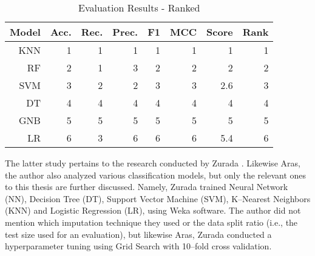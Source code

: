 \begin{table}[H]
    \small
    \setlength{\tabcolsep}{8pt}
    \renewcommand{\arraystretch}{1.3}
    \centering
    \caption[Evaluation Results - Ranked \citep{serkan2021bagging}]{Evaluation Results - Ranked \citep{serkan2021bagging}}\label{tab:serkanresultsranks}
    \begin{tabular}{r r r r r r r r}
    \toprule
    \textbf{Model} & \textbf{Acc.} & \textbf{Rec.} & \textbf{Prec.} & \textbf{F1} & \textbf{MCC} & \textbf{Score} & \textbf{Rank} \\
    \midrule
    \hline
	
    KNN & 1 & 1 & 1 & 1 & 1 & 1 & 1 \\ 
    RF & 2 & 1 & 3 & 2 & 2 & 2 & 2 \\ 
    SVM & 3 & 2 & 2 & 3 & 3 & 2.6 & 3 \\ 
    DT & 4 & 4 & 4 & 4 & 4 & 4 & 4 \\ 
    GNB & 5 & 5 & 5 & 5 & 5 & 5 & 5 \\ 
    LR & 6 & 3 & 6 & 6 & 6 & 5.4 & 6 \\ 
	
    \hline
    \bottomrule
    \end{tabular}
    \vspace{0.35em}
    
    \vspace{-1em}
\end{table}


The latter study pertains to the research conducted by Zurada \citep{zurada2014classification}. Likewise Aras, the author also analyzed various classification models, but only the relevant ones to this thesis are further discussed.
Namely, Zurada trained Neural Network (NN), Decision Tree (DT), Support Vector Machine (SVM), K--Nearest Neighbors (KNN) and Logistic Regression (LR), using Weka software.
The author did not mention which imputation technique they used or the data split ratio (i.e., the test size used for an evaluation), but likewise Aras, Zurada conducted a hyperparameter tuning using Grid Search with 10--fold cross validation.


